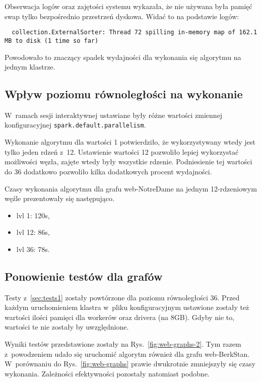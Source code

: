 \documentclass[a4paper; 12pt]{article}
\begin{document}
Obserwacja logów oraz zajętości systemu wykazała, że nie używana była pamięć
swap tylko bezpośrednio przestrzeń dyskowa.
Widać to na podstawie logów:
\begin{lstlisting}
  collection.ExternalSorter: Thread 72 spilling in-memory map of 162.1 MB to disk (1 time so far)
\end{lstlisting}

Powodowało to znaczący spadek wydajności dla wykonania się algorytmu na jednym klastrze.

\subsection{Wpływ poziomu równoległości na wykonanie}

W~ramach sesji interaktywnej ustawiane były różne wartości zmiennej
konfiguracyjnej \texttt{spark.default.parallelism}.

Wykonanie algorytmu dla wartości 1 potwierdziło, że wykorzystywany wtedy jest
tylko jeden rdzeń z~12.
Ustawienie wartości 12 pozwoliło lepiej wykorzystać możliwości węzła, zajęte
wtedy były wszystkie rdzenie.
Podniesienie tej wartości do 36 dodatkowo pozwoliło kilka dodatkowych procent
wydajności.

Czasy wykonania algorytmu dla grafu web-NotreDame na jednym 12-rdzeniowym węźle
prezentowały się następująco.
\begin{itemize}
  \item lvl 1: 120s,
  \item lvl 12: 86s,
  \item lvl 36: 78s.
\end{itemize}

\subsection{Ponowienie testów dla grafów}

Testy z~\ref{sec:tests1} zostały powtórzone dla poziomu równoległości 36.
Przed każdym uruchomieniem klastra w~pliku konfiguracyjnym ustawione zostały
też wartości ilości pamięci dla workerów oraz drivera (na 8GB).
Gdyby nie to, wartości te nie zostały by uwzględnione.

Wyniki testów przedstawione zostały na Rys.~\ref{fig:web-graphs-2}.
Tym razem z~powodzeniem udało się uruchomić algorytm również dla grafu web-BerkStan.
W~porównaniu do Rys.~\ref{fig:web-graphs} prawie dwukrotnie zmniejszyły się
czasy wykonania.
Zależności efektywności pozostały natomiast podobne.
\end{document}
